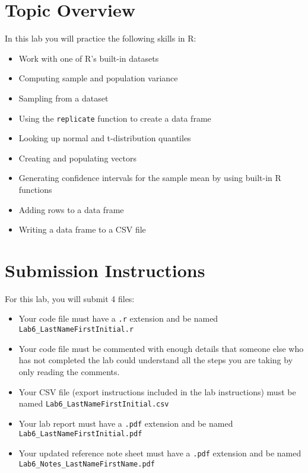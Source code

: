 \documentclass{article}
\begin{document}
\section{Topic Overview}

In this lab you will practice the following skills in R:

\begin{itemize}
    \item Work with one of R’s built-in datasets
    \item Computing sample and population variance
    \item Sampling from a dataset
    \item Using the \texttt{replicate} function to create a data frame
    \item Looking up normal and t-distribution quantiles
    \item Creating and populating vectors
    \item Generating confidence intervals for the sample mean by using built-in R functions
    \item Adding rows to a data frame
    \item Writing a data frame to a CSV file
\end{itemize}

\section{Submission Instructions}

For this lab, you will submit 4 files:

\begin{itemize}
    \item Your code file must have a \texttt{.r} extension and be named \texttt{Lab6\_LastNameFirstInitial.r}
    \item Your code file must be commented with enough details that someone else who has not completed the lab could understand all the steps you are taking by only reading the comments.
    \item Your CSV file (export instructions included in the lab instructions) must be named \texttt{Lab6\_LastNameFirstInitial.csv}
    \item Your lab report must have a \texttt{.pdf} extension and be named \texttt{Lab6\_LastNameFirstInitial.pdf}
    \item Your updated reference note sheet must have a \texttt{.pdf} extension and be named \texttt{Lab6\_Notes\_LastNameFirstName.pdf}
\end{itemize}
\end{document}
